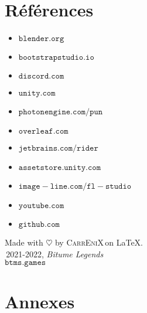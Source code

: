 \documentclass[a4paper,12pt]{article}
\newcommand{\btmlgs}{\textsl{Bitume Legends}}
\newcommand{\CEX}{\textsc{CarrEniX}}
\newcommand{\SITE}{\(\mathtt{btms.games}\)}
\begin{document}
        \section*{Références}
        \begin{itemize}
            \item \(\mathtt{blender.org}\)
            \item \(\mathtt{bootstrapstudio.io}\)
            \item \(\mathtt{discord.com}\)
            \item \(\mathtt{unity.com}\)
            \item \(\mathtt{photonengine.com/pun}\)
            \item \(\mathtt{overleaf.com}\)
            \item \(\mathtt{jetbrains.com/rider}\)
            \item \(\mathtt{assetstore.unity.com}\)
            \item \(\mathtt{image-line.com/fl-studio}\)
            \item \(\mathtt{youtube.com}\)
            \item \(\mathtt{github.com}\)
        \end{itemize}
    
    \begin{center}
        Made with $\heartsuit$ by \CEX\,on \LaTeX.\\
        \textcopyright\,2021-2022, \btmlgs\\
        \SITE
    \end{center}


    \clearpage
    \section*{Annexes}
    \listoftables
    \listoffigures
\end{document}
